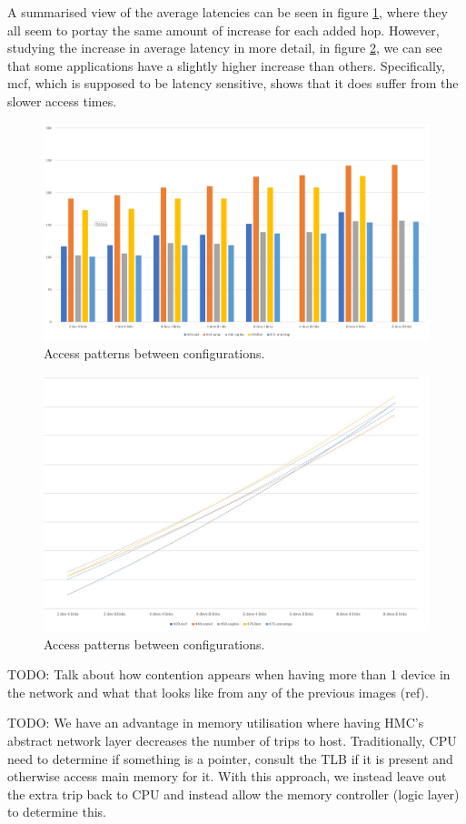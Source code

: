 A summarised view of the average latencies can be seen in figure \ref{All-apps-latency}, where they all seem to portay the same amount of increase for each added hop. However, studying the increase in average latency in more detail, in figure \ref{All-apps-latency-trends}, we can see that some applications have a slightly higher increase than others. Specifically, mcf, which is supposed to be latency sensitive, shows that it does suffer from the slower access times. 

\begin{figure}[!h]
    \centering
    \includegraphics[width=0.75\linewidth]{figure/all-apps-latencies.jpg}
    \caption{Access patterns between configurations.}
    \label{All-apps-latency}
\end{figure}

\begin{figure}[!h]
    \centering
    \includegraphics[width=0.75\linewidth]{figure/all-apps-latencies-trends.jpg}
    \caption{Access patterns between configurations.}
    \label{All-apps-latency-trends}
\end{figure}

TODO: Talk about how contention appears when having more than 1 device in the network and what that looks like from any of the previous images (ref).

TODO: We have an advantage in memory utilisation where having HMC's abstract network layer decreases the number of trips to host. Traditionally, CPU need to determine if something is a pointer, consult the TLB if it is present and otherwise access main memory for it. With this approach, we instead leave out the extra trip back to CPU and instead allow the memory controller (logic layer) to determine this. 